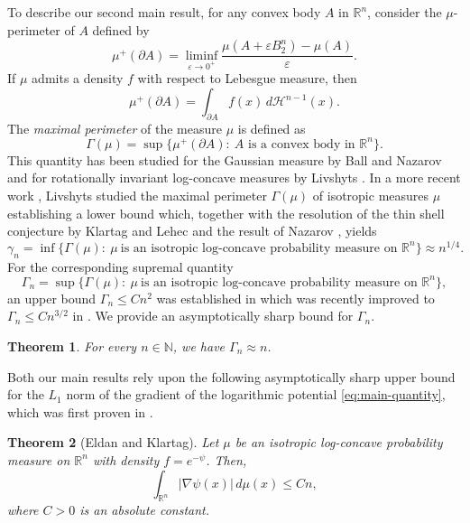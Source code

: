 \documentclass[11pt,leqno]{article}
\newtheorem{theorem}{Theorem}[section]
\theoremstyle{definition}
\theoremstyle{remark}
\numberwithin{equation}{section}
\newcommand{\ls}{\leqslant}
\renewcommand{\epsilon}{\varepsilon}
\newcommand{\1}{\textbf{1}}
\newcommand{\R}{\mathbb{R}}
\begin{document}
To describe our second main result, for any convex body $A$ in $\mathbb{R}^n$, consider the $\mu$-perimeter of $A$ defined by
$$\mu^+(\partial A)=\liminf_{\epsilon \to 0^+}\frac{\mu(A+\epsilon B_2^n)-\mu(A)}{\epsilon}.$$
If $\mu$ admits a density $f$ with respect to Lebesgue measure, then
$$\mu^+(\partial A)=\int_{\partial A}f(x)\,d\mathcal{H}^{n-1}(x).$$
The \emph{maximal perimeter} of the measure $\mu$ is defined as
$$\Gamma(\mu) = \sup \{ \mu^+(\partial A): \ A \mbox{ is a convex body in } \R^n\}.$$
This quantity has been studied for the Gaussian measure by Ball and Nazarov \cite{Bal93,Naz03} and for rotationally invariant log-concave measures by Livshyts \cite{Liv13,Liv14,Liv15}. In a more recent work \cite{Liv21}, Livshyts studied the maximal perimeter $\Gamma(\mu)$ of isotropic measures $\mu$ establishing a lower bound which, together with the resolution of the thin shell conjecture by Klartag and Lehec \cite{KL25} and the result of Nazarov \cite{Naz03}, yields
$$\gamma_n = \inf\{\Gamma(\mu): \ \mu \ \mbox{is an isotropic log-concave probability measure on } \R^n \} \approx n^{1/4}.$$
For the corresponding supremal quantity
$$\Gamma_n = \sup\{\Gamma(\mu): \ \mu \ \mbox{is an isotropic log-concave probability measure on } \R^n \},$$
an upper bound $\Gamma_n \ls Cn^2$ was established in \cite{Liv21} which was recently improved to $\Gamma_n\ls Cn^{3/2}$ in \cite{BGHT}. We provide 
an asymptotically sharp bound for $\Gamma_n$.

\begin{theorem} \label{thm:weight-per}
For every $n\in\mathbb{N}$, we have $\Gamma_n \approx n$.
\end{theorem}

Both our main results rely upon the following asymptotically sharp upper bound for the $L_1$ norm of the gradient of the logarithmic potential \eqref{eq:main-quantity}, which was first proven in \cite[Lemma~11]{EK08}.

\begin{theorem} [Eldan and Klartag] \label{thm:gradient-upper}
Let $\mu$ be an isotropic log-concave probability measure on $\mathbb{R}^n$ with density $f=e^{-\psi}$. Then,
\begin{equation} \label{eq:ek}
\int_{\mathbb{R}^n} |\nabla \psi(x)|\, d\mu(x) \ls Cn,
\end{equation}
where $C>0$ is an absolute constant.
\end{theorem}
\end{document}
